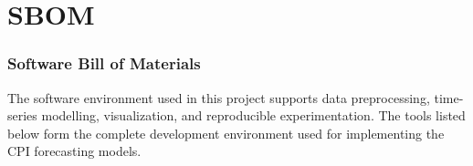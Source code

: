 %
%
%




\chapter{SBOM}




\subsection{Software Bill of Materials}

The software environment used in this project supports data preprocessing, time-series modelling, visualization, and reproducible experimentation. The tools listed below form the complete development environment used for implementing the CPI forecasting models.


